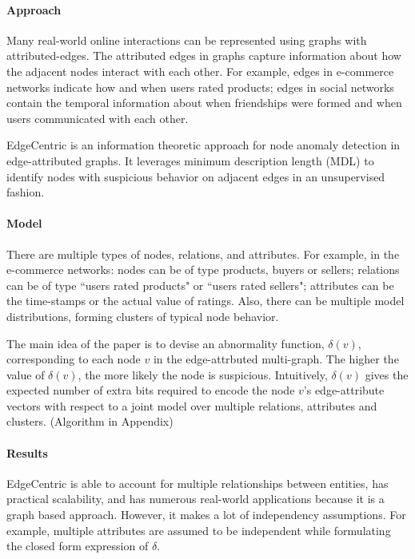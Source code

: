 \documentclass[11pt, oneside]{article}   	%
\begin{document}
\paragraph{Approach}
\quad

\quad Many real-world online interactions can be represented using graphs with attributed-edges.
The attributed edges in graphs capture information about how the adjacent nodes interact with each other.
For example, edges in e-commerce networks indicate how and when users rated products; edges in social networks contain the temporal information about when friendships were formed and when users communicated with each other.

\quad EdgeCentric \cite{edgecentric} is an information theoretic approach for node anomaly detection in edge-attributed graphs.%
It leverages minimum description length (MDL) to identify nodes with suspicious behavior on adjacent edges in an unsupervised fashion. 

\paragraph{Model}
\quad

\quad There are multiple types of nodes, relations, and attributes.
For example, in the e-commerce networks: nodes can be of type products, buyers or sellers; relations can be of type ``users rated products" or ``users rated sellers"; attributes can be the time-stamps or the actual value of ratings.
Also, there can be multiple model distributions, forming clusters of typical node behavior.

\quad The main idea of the paper is to devise an abnormality function, $\delta(v)$, corresponding to each node $v$ in the edge-attrbuted multi-graph.
The higher the value of $\delta(v)$, the more likely the node is suspicious.
Intuitively, $\delta(v)$ gives the expected number of extra bits required to encode the node $v$’s edge-attribute vectors with respect to a joint model over multiple relations, attributes and clusters. (Algorithm in Appendix)

\paragraph{Results}
\quad

\quad EdgeCentric is able to account for multiple relationships between entities, has practical scalability, and has numerous real-world applications because it is a graph based approach.
However, it makes a lot of independency assumptions.
For example, multiple attributes are assumed to be independent while formulating the closed form expression of $\delta$. 
\end{document}
